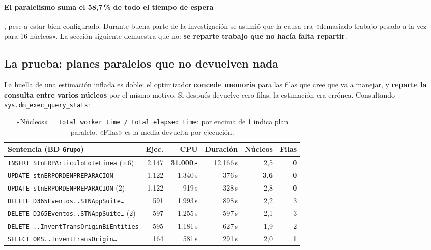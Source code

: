 \documentclass[11pt,a4paper]{article}
\newcommand{\cod}[1]{\texttt{\small #1}}
\newcommand{\critico}[1]{\textcolor{rojo}{\textbf{#1}}}
\begin{document}
\paragraph{El paralelismo suma el \critico{58,7\,\%} de todo el tiempo de
espera}, pese a estar bien configurado. Durante buena parte de la
investigación se asumió que la causa era «demasiado trabajo pesado a la vez
para 16 núcleos». La sección siguiente demuestra que no: \textbf{se reparte
trabajo que no hacía falta repartir}.

\subsection{La prueba: planes paralelos que no devuelven nada}
\label{sec:prueba}

La huella de una estimación inflada es doble: el optimizador \textbf{concede
memoria} para las filas que cree que va a manejar, y \textbf{reparte la
consulta entre varios núcleos} por el mismo motivo. Si después devuelve cero
filas, la estimación era errónea. Consultando
\cod{sys.dm\_exec\_query\_stats}:

\begin{table}[h]
\centering
\small
\begin{tabular}{lrrrrr}
\toprule
\textbf{Sentencia (BD \cod{Grupo})} & \textbf{Ejec.} & \textbf{CPU} &
\textbf{Duración} & \textbf{Núcleos} & \textbf{Filas} \\
\midrule
\cod{INSERT StnERPArticuloLoteLinea} ($\times$6) & 2.147 & \critico{31.000\,s} &
  12.166\,s & 2,5 & \critico{0} \\
\cod{UPDATE stnERPORDENPREPARACION} & 1.122 & 1.340\,s & 376\,s &
  \critico{3,6} & \critico{0} \\
\cod{UPDATE stnERPORDENPREPARACION} (2) & 1.122 & 919\,s & 328\,s & 2,8 &
  \critico{0} \\
\cod{DELETE D365Eventos..STNAppSuite\ldots} & 591 & 1.993\,s & 898\,s & 2,2 & 3 \\
\cod{DELETE D365Eventos..STNAppSuite\ldots} (2) & 597 & 1.255\,s & 597\,s & 2,1 & 3 \\
\cod{DELETE ..InventTransOriginBiEntities} & 595 & 1.181\,s & 627\,s & 1,9 & 2 \\
\cod{SELECT OMS..InventTransOrigin\ldots} & 164 & 581\,s & 291\,s & 2,0 &
  \critico{1} \\
\bottomrule
\end{tabular}
\caption{«Núcleos» = \cod{total\_worker\_time / total\_elapsed\_time}: por
encima de 1 indica plan paralelo. «Filas» es la media devuelta por ejecución.}
\end{table}
\end{document}
